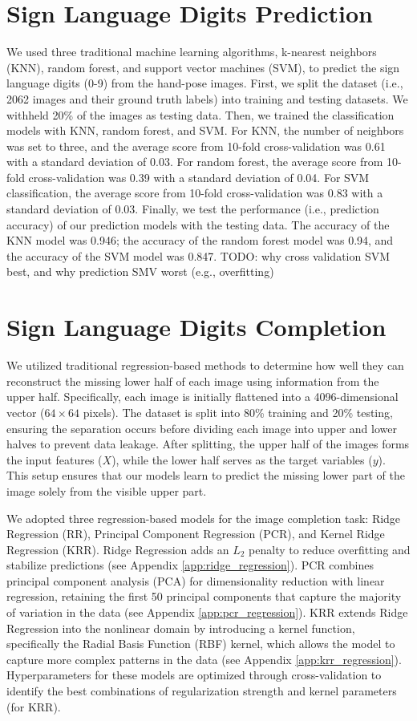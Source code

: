 \documentclass{article}
\begin{document}
\section{Sign Language Digits Prediction}
We used three traditional machine learning algorithms, k-nearest neighbors (KNN), random forest, and support vector machines (SVM), to predict the sign language digits (0-9) from the hand-pose images. First, we split the dataset (i.e., 2062 images and their ground truth labels) into training and testing datasets. We withheld 20\% of the images as testing data. Then, we trained the classification models with KNN, random forest, and SVM. For KNN, the number of neighbors was set to three, and the average score from 10-fold cross-validation was 0.61 with a standard deviation of 0.03. For random forest, the average score from 10-fold cross-validation was 0.39 with a standard deviation of 0.04. For SVM classification, the average score from 10-fold cross-validation was 0.83 with a standard deviation of 0.03.
Finally, we test the performance (i.e., prediction accuracy) of our prediction models with the testing data. The accuracy of the KNN model was 0.946; the accuracy of the random forest model was 0.94, and the accuracy of the SVM model was 0.847.
TODO: why cross validation SVM best, and why prediction SMV worst (e.g., overfitting)

\section{Sign Language Digits Completion}
We utilized traditional regression-based methods to determine how well they can reconstruct the missing lower half of each image using information from the upper half. Specifically, each image is initially flattened into a 4096-dimensional vector ($64 \times 64$ pixels). The dataset is split into 80\% training and 20\% testing, ensuring the separation occurs before dividing each image into upper and lower halves to prevent data leakage. After splitting, the upper half of the images forms the input features ($X$), while the lower half serves as the target variables ($y$). This setup ensures that our models learn to predict the missing lower part of the image solely from the visible upper part.

We adopted three regression-based models for the image completion task: Ridge Regression (RR), Principal Component Regression (PCR), and Kernel Ridge Regression (KRR). Ridge Regression adds an $L_2$ penalty to reduce overfitting and stabilize predictions (see Appendix \ref{app:ridge_regression}). PCR combines principal component analysis (PCA) for dimensionality reduction with linear regression, retaining the first 50 principal components that capture the majority of variation in the data (see Appendix \ref{app:pcr_regression}). KRR extends Ridge Regression into the nonlinear domain by introducing a kernel function, specifically the Radial Basis Function (RBF) kernel, which allows the model to capture more complex patterns in the data (see Appendix \ref{app:krr_regression}). Hyperparameters for these models are optimized through cross-validation to identify the best combinations of regularization strength and kernel parameters (for KRR).
\end{document}
